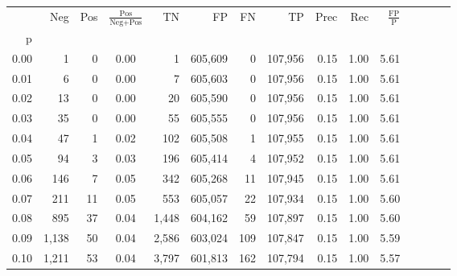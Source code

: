 \begin{tabular}{rrrcrrrrrrrrrrr}
\toprule
{} &     Neg &    Pos & $\frac{\text{Pos}}{\text{Neg}+\text{Pos}}$ &       TN &       FP &       FN &       TP &  Prec &   Rec & $\frac{\text{FP}}{\text{P}}$ \\
p    &         &        &                                            &          &          &          &          &       &       &                              \\
\midrule
0.00 &       1 &      0 &                                       0.00 &        1 &  605,609 &        0 &  107,956 &  0.15 &  1.00 &                         5.61 \\
0.01 &       6 &      0 &                                       0.00 &        7 &  605,603 &        0 &  107,956 &  0.15 &  1.00 &                         5.61 \\
0.02 &      13 &      0 &                                       0.00 &       20 &  605,590 &        0 &  107,956 &  0.15 &  1.00 &                         5.61 \\
0.03 &      35 &      0 &                                       0.00 &       55 &  605,555 &        0 &  107,956 &  0.15 &  1.00 &                         5.61 \\
0.04 &      47 &      1 &                                       0.02 &      102 &  605,508 &        1 &  107,955 &  0.15 &  1.00 &                         5.61 \\
0.05 &      94 &      3 &                                       0.03 &      196 &  605,414 &        4 &  107,952 &  0.15 &  1.00 &                         5.61 \\
0.06 &     146 &      7 &                                       0.05 &      342 &  605,268 &       11 &  107,945 &  0.15 &  1.00 &                         5.61 \\
0.07 &     211 &     11 &                                       0.05 &      553 &  605,057 &       22 &  107,934 &  0.15 &  1.00 &                         5.60 \\
0.08 &     895 &     37 &                                       0.04 &    1,448 &  604,162 &       59 &  107,897 &  0.15 &  1.00 &                         5.60 \\
0.09 &   1,138 &     50 &                                       0.04 &    2,586 &  603,024 &      109 &  107,847 &  0.15 &  1.00 &                         5.59 \\
0.10 &   1,211 &     53 &                                       0.04 &    3,797 &  601,813 &      162 &  107,794 &  0.15 &  1.00 &                         5.57 \\

\end{tabular}
